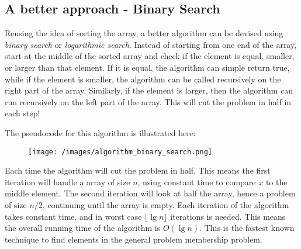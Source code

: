     \subsection{A better approach - Binary Search}

        Reusing the idea of sorting the array, a better algorithm can be devised using \emph{binary search} or \emph{logarithmic search}.
        Instead of starting from one end of the array, start at the middle of the sorted array and check if the element is equal, smaller, or larger than that element.
        If it is equal, the algorithm can simple return true, while if the element is smaller, the algorithm can be called recursively on the right part of the array.
        Similarly, if the element is larger, then the algorithm can run recursively on the left part of the array.
        This will cut the problem in half in each step!


        The pseudocode for this algorithm is illustrated here:

        \begin{figure}[!h]
            \centering
            \texttt{[image: /images/algorithm\_binary\_search.png]}
        \end{figure}

        Each time the algorithm will cut the problem in half.
        This means the first iteration will handle a array of size $n$, using constant time to compare $x$ to the middle element.
        The second iteration will look at half the array, hence a problem of size $n/2$, continuing until the array is empty.
        Each iteration of the algorithm takes constant time, and in worst case $\lfloor\lg n \rfloor$ iterations is needed.
        This means the overall running time of the algorithm is $O(\lg n)$.
        This is the fastest known technique to find elements in the general problem membership problem.


